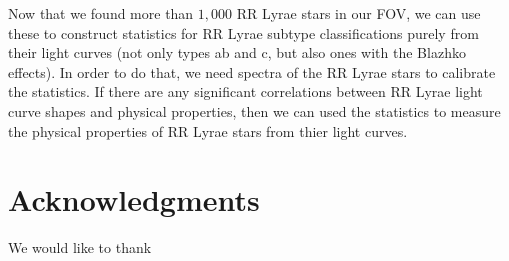 \documentclass[aps,prb,twocolumn,superscriptaddress]{revtex4-1}
\begin{document}
\indent Now that we found more than $1,000$ RR Lyrae stars in our FOV, we can use these to construct statistics for RR Lyrae subtype classifications purely from their light curves (not only types ab and c, but also ones with the Blazhko effects). In order to do that, we need spectra of the RR Lyrae stars to calibrate the statistics. If there are any significant correlations between RR Lyrae light curve shapes and physical properties, then we can used the statistics to measure the physical properties of RR Lyrae stars from thier light curves.








\section*{Acknowledgments}
We would like to thank   %





\setlength{\parindent}{0cm}
\end{document}
